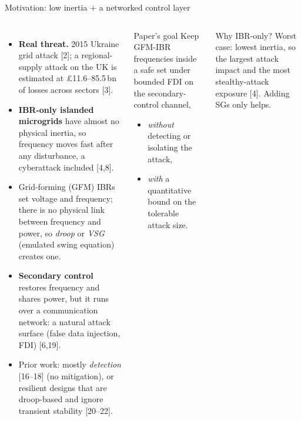 \documentclass[aspectratio=169,9pt]{beamer}
\begin{document}
\begin{frame}[t]{Motivation: low inertia $+$ a networked control layer}
\begin{columns}[T]
\footnotesize
\begin{itemize}
\item \textbf{Real threat.} 2015 Ukraine grid attack [2]; a regional-supply attack on the UK is estimated at \pounds11.6--85.5\,bn of losses across sectors [3].
\item \textbf{IBR-only islanded microgrids} have almost no physical inertia, so frequency moves fast after any disturbance, a cyberattack included [4,8].
\item Grid-forming (GFM) IBRs set voltage and frequency; there is no physical link between frequency and power, so \emph{droop} or \emph{VSG} (emulated swing equation) creates one.
\item \textbf{Secondary control} restores frequency and shares power, but it runs over a communication network: a natural attack surface (false data injection, FDI) [6,19].
\item Prior work: mostly \emph{detection} [16--18] (no mitigation), or resilient designs that are droop-based and ignore transient stability [20--22].
\end{itemize}
\begin{block}{Paper's goal}\footnotesize
Keep GFM-IBR frequencies inside a safe set under bounded FDI on the secondary-control channel,
\begin{itemize}
\item \emph{without} detecting or isolating the attack,
\item \emph{with} a quantitative bound on the tolerable attack size.
\end{itemize}
\end{block}
\begin{block}{Why IBR-only?}\footnotesize
Worst case: lowest inertia, so the largest attack impact and the most stealthy-attack exposure [4]. Adding SGs only helps.
\end{block}
\end{columns}
\end{frame}
\end{document}

